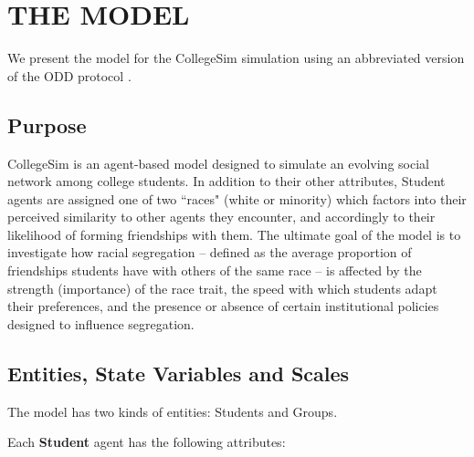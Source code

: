 
\section{THE MODEL}
\label{sec:model}

We present the model for the CollegeSim simulation using an abbreviated
version of the ODD protocol \cite[Grimm \textit{et al.} 2008]{polhill_using_2008}.

\subsection{Purpose}

CollegeSim is an agent-based model designed to simulate an evolving social
network among college students. In addition to their other attributes, Student
agents are assigned one of two ``races" (white or minority) which factors into
their perceived similarity to other agents they encounter, and accordingly to
their likelihood of forming friendships with them. The ultimate goal of the
model is to investigate how racial segregation -- defined as the average
proportion of friendships students have with others of the same race -- is
affected by the strength (importance) of the race trait, the speed with which
students adapt their preferences, and the presence or absence of certain
institutional policies designed to influence segregation.

\subsection{Entities, State Variables and Scales}

The model has two kinds of entities: Students and Groups.


\vspace{.1in}
Each \textbf{Student} agent has the following attributes:

